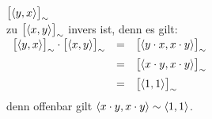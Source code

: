 $\bigl[\pair(y,x)\bigr]_\sim$
\\[0.2cm]
zu $\bigl[\pair(x,y)\bigr]_\sim$ invers ist, denn es gilt:
\\[0.2cm]
\hspace*{1.3cm}
$
\begin{array}[t]{lcl}
      \bigl[\pair(y,x)\bigr]_\sim \cdot \bigl[\pair(x,y)\bigr]_\sim 
& = & \bigl[\pair(y \cdot x,x \cdot y)\bigr]_\sim                   \\[0.2cm]
& = & \bigl[\pair(x \cdot y,x \cdot y)\bigr]_\sim                   \\[0.2cm]
& = & \bigl[\pair(1, 1)\bigr]_\sim                   \\[0.2cm]
\end{array}
$
\\[0.2cm]
denn offenbar gilt $\pair(x \cdot y,x \cdot y) \sim \pair(1,1)$.
\vspace*{0.2cm}

